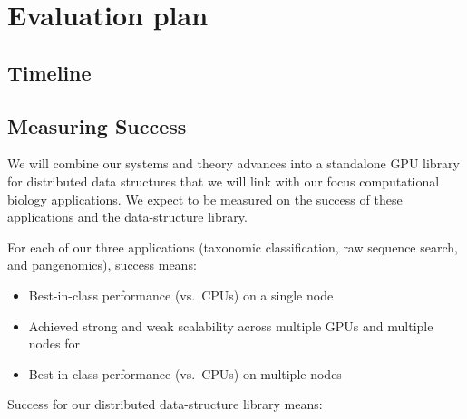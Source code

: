 \section{Evaluation plan}


\subsection{Timeline}

\subsection{Measuring Success} We will combine our systems and theory advances into a standalone GPU library for distributed data structures that we will link with our focus computational biology applications. We expect to be measured on the success of these applications and the data-structure library.

For each of our three applications (taxonomic classification, raw sequence search, and pangenomics), success means:

\begin{itemize}[noitemsep]
  \item Best-in-class performance (vs.\ CPUs) on a single node
  \item Achieved strong and weak scalability across multiple GPUs and multiple nodes for
  \item Best-in-class performance (vs.\ CPUs) on multiple nodes
\end{itemize}

\noindent
Success for our distributed data-structure library means:

\label{sec:sw-methodology}

